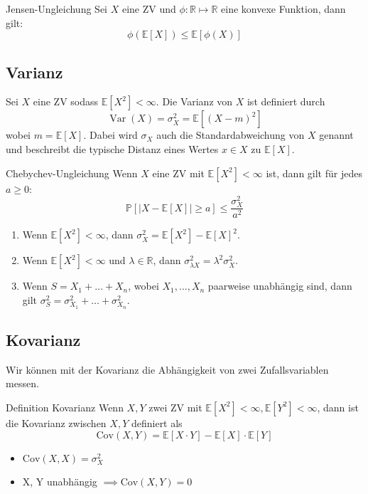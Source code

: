 \documentclass[a4paper,10pt]{article}
\def\R{\mathbb{R}}
\def\P{\mathbb{P}}
\def\E{\mathbb{E}}
\DeclareMathOperator{\Var}{\text{Var}}
\begin{document}
\begin{subbox}{Jensen-Ungleichung}
	Sei \(X\) eine ZV und \(\phi : \R \mapsto \R\) eine konvexe Funktion, dann gilt:
	\[\phi(\E[X]) \le \E[\phi(X)]\]
\end{subbox}

\subsection{Varianz}
Sei \(X\) eine ZV sodass \(\E[X^2] < \infty\). Die Varianz von \(X\) ist definiert durch
\[\Var(X) = \sigma_X^2 = \E[(X-m)^2]\]
wobei \(m=\E[X]\). Dabei wird \(\sigma_X\) auch die Standardabweichung von \(X\) genannt und beschreibt die typische Distanz eines Wertes \(x\in X\) zu \(\E[X]\).

\begin{subbox}{Chebychev-Ungleichung}
	Wenn \(X\) eine ZV mit \(\E[X^2] < \infty\) ist, dann gilt für jedes \(a \ge 0\):
	\[\P[|X - \E[X]| \ge a] \le \frac{\sigma_X^2}{a^2}\]
\end{subbox}

\begin{enumerate}
	\item Wenn \(\E[X^2] < \infty\), dann \(\sigma_X^2 = \E[X^2] - \E[X]^2\).
	\item Wenn \(\E[X^2] < \infty\) und \(\lambda \in \R\), dann \(\sigma_{\lambda X}^2 = \lambda^2\sigma_X^2\).
	\item Wenn \(S = X_1 + \ldots + X_n\), wobei \(X_1, \ldots, X_n\) paarweise unabhängig sind, dann gilt \(\sigma_S^2 = \sigma_{X_1}^2 + \ldots + \sigma_{X_n}^2\).
\end{enumerate}

\subsection{Kovarianz}
Wir können mit der Kovarianz die Abhängigkeit von zwei Zufallsvariablen messen.
\begin{subbox}{Definition Kovarianz}
	Wenn \(X, Y\) zwei ZV mit \(\E[X^2] < \infty, \E[Y^2] < \infty\), dann ist die Kovarianz zwischen \(X, Y\) definiert als
	\[\text{Cov}(X,Y) = \E[X \cdot Y] - \E[X] \cdot \E[Y]\]
\end{subbox}
\begin{itemize}
	\item \(\text{Cov}(X,X) = \sigma_X^2\)
	\item X, Y unabhängig \(\implies \text{Cov}(X,Y) = 0\)
\end{itemize}
\end{document}
